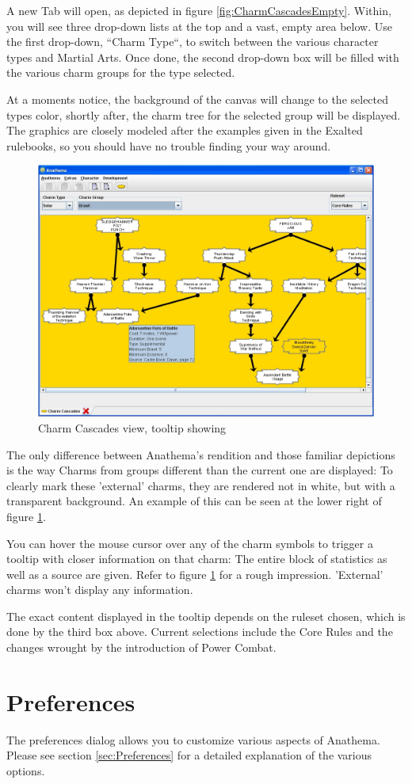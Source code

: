 A new Tab will open, as depicted in figure \ref{fig:CharmCascadesEmpty}. Within, you will see three drop-down lists at the top and a vast, empty area below. Use the first drop-down, ``Charm Type``, to switch between the various character types and Martial Arts. Once done, the second drop-down box will be filled with the various charm groups for the type selected.

At a moments notice, the background of the canvas will change to the selected types color, shortly after, the charm tree for the selected group will be displayed. The graphics are closely modeled after the examples given in the Exalted rulebooks, so you should have no trouble finding your way around.

\begin{figure}[htb]
	\centering
		\includegraphics[width=1.00\textwidth]{Images/CharmCascadesTooltip.jpg}
	\caption{Charm Cascades view, tooltip showing}
	\label{fig:CharmCascadesTooltip}
\end{figure}

The only difference between Anathema's rendition and those familiar depictions is the way Charms from groups different than the current one are displayed: To clearly mark these 'external' charms, they are rendered not in white, but with a transparent background. An example of this can be seen at the lower right of figure \ref{fig:CharmCascadesTooltip}.

You can hover the mouse cursor over any of the charm symbols to trigger a tooltip with closer information on that charm: The entire block of statistics as well as a source are given. Refer to figure \ref{fig:CharmCascadesTooltip} for a rough impression. 'External' charms won't display any information.

The exact content displayed in the tooltip depends on the ruleset chosen, which is done by the third box above. Current selections include the Core Rules and the changes wrought by the introduction of Power Combat.

\section{Preferences}
The preferences dialog allows you to customize various aspects of Anathema. Please see section \ref{sec:Preferences} for a detailed explanation of the various options.